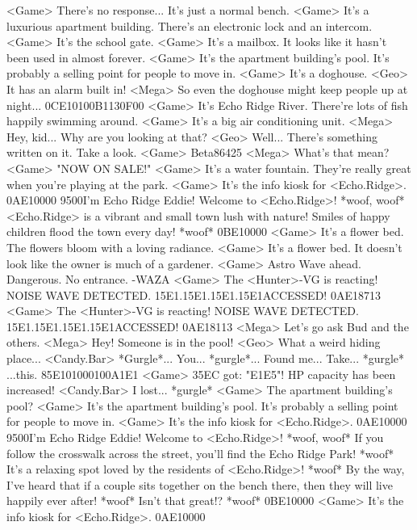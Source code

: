 <Game> There's no response... 
It's just a normal bench. 
<Game> It's a luxurious apartment building. There's an electronic lock and an intercom. 
<Game> It's the school gate. 
<Game> It's a mailbox. 
It looks like it hasn't been used in almost forever. 
<Game> It's the apartment building's pool. It's probably a selling point for people to move in. 
<Game> It's a doghouse. 
<Geo> It has an alarm built in! 
<Mega> So even the doghouse might keep people up at night... 
{0C}{E1}{01}{00}{B1}{13}{0F}{00}
<Game> It's Echo Ridge River. 
There're lots of fish happily swimming around. 
<Game> It's a big air conditioning unit. 
<Mega> Hey, kid... Why are you looking at that? 
<Geo> Well... There's something written on it. Take a look. 
<Game>   Beta86425 
<Mega> What's that mean? 
<Game> "NOW ON SALE!" 
<Game> It's a water fountain. 
They're really great when you're playing at the park. 
<Game> It's the info kiosk for <Echo.Ridge>. 
{0A}{E1}{00}{00} 
{95}{00}I'm Echo Ridge Eddie! Welcome to <Echo.Ridge>! *woof, woof* 
<Echo.Ridge> is a vibrant and small town lush with nature! 
Smiles of happy children flood the town every day! *woof* 
{0B}{E1}{00}{00}
<Game> It's a flower bed. 
The flowers bloom with a loving radiance. 
<Game> It's a flower bed. 
It doesn't look like the owner is much of a gardener. 
<Game> Astro Wave ahead. Dangerous. No entrance.   -WAZA 
<Game> The <Hunter>-VG is reacting! 
NOISE WAVE DETECTED. {15}{E1}.{15}{E1}.{15}{E1}.{15}{E1}ACCESSED! 
{0A}{E1}{87}{13}
<Game> The <Hunter>-VG is reacting! 
NOISE WAVE DETECTED. {15}{E1}.{15}{E1}.{15}{E1}.{15}{E1}ACCESSED! 
{0A}{E1}{81}{13}
<Mega> Let's go ask Bud and the others. 
<Mega> Hey! Someone is in the pool! 
<Geo> What a weird hiding place... 
<Candy.Bar> *Gurgle*... You... *gurgle*... Found me... 
Take... *gurgle* ...this. 
{85}{E1}{01}{00}{01}{00}{A1}{E1} 
<Game> {35}{EC} got: "{E1}{E5}"! 
HP capacity has been increased! 
<Candy.Bar> I lost... *gurgle* 
<Game> The apartment building's pool? 
<Game> It's the apartment building's pool. It's probably a selling point for people to move in. 
<Game> It's the info kiosk for <Echo.Ridge>. 
{0A}{E1}{00}{00} 
{95}{00}I'm Echo Ridge Eddie! Welcome to <Echo.Ridge>! 
*woof, woof* 
If you follow the crosswalk across the street, you'll find the Echo Ridge Park! *woof* 
It's a relaxing spot loved by the residents of <Echo.Ridge>! *woof* 
By the way, I've heard that if a couple sits together on the bench there, then they 
will live happily ever after! *woof* 
Isn't that great!? *woof* 
{0B}{E1}{00}{00}
<Game> It's the info kiosk for <Echo.Ridge>. 
{0A}{E1}{00}{00} 
